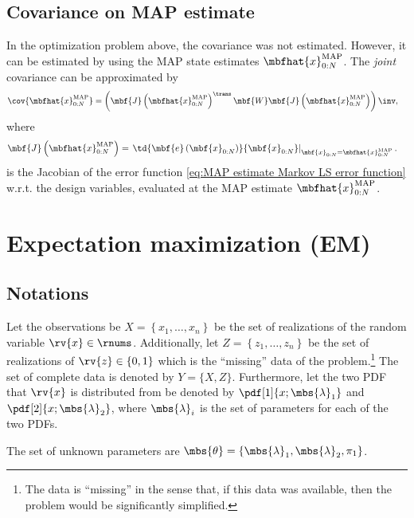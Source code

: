 \subsection{Covariance on MAP estimate}
In the optimization problem above, the covariance was not estimated. However, it can be estimated by using the MAP state estimates $\mbfhat{x}^{\mathrm{MAP}}_{0:N}$. The \emph{joint} covariance can be approximated by
\begin{align}
    \cov{\mbfhat{x}_{0:N}^{\mathrm{MAP}}} &=
    \left( \mbf{J}\left(\mbfhat{x}_{0:N}^{\mathrm{MAP}}\right)^{\trans}\mbf{W}\mbf{J}\left(\mbfhat{x}_{0:N}^{\mathrm{MAP}}\right) \right)\inv,
\end{align}
where 
\begin{align}
    \mbf{J}\left(\mbfhat{x}_{0:N}^{\mathrm{MAP}}\right) &= 
    \left. \td{\mbf{e}\left( \mbf{x}_{0:N} \right)}{\mbf{x}_{0:N}}\right|_{\mbf{x}_{0:N}=\mbfhat{x}_{0:N}^{\mathrm{MAP}}}.
\end{align}
is the Jacobian of the error function \eqref{eq:MAP estimate Markov LS error function} w.r.t. the design variables, evaluated at the MAP estimate $\mbfhat{x}_{0:N}^{\mathrm{MAP}}$.



\section{Expectation maximization (EM)}
\newcommand{\zhat}[2][{}]{\ifthenelse{\equal{#1}{}}{\hat{z}_{#2}}{\hat{z}_{#2}^{(#1)}}}

\subsection{Notations}
Let the observations be $X=\left\{ x_{1}, \ldots, x_{n} \right\}$ be the set of realizations of the random variable $\rv{x}\in\rnums$. Additionally, let $Z = \left\{ z_{1},\ldots, z_{n} \right\}$ be the set of realizations of $\rv{z}\in\left\{ 0,1 \right\}$ which is the ``missing'' data of the problem.\footnote{The data is ``missing'' in the sense that, if this data was available, then the problem would be significantly simplified.} The set of complete data is denoted by $Y = \{X, Z\}$.
Furthermore, let the two PDF that $\rv{x}$ is distributed from be denoted by $\pdf[1]{x; \mbs{\lambda}_{1}}$ and $\pdf[2]{x; \mbs{\lambda}_{2}}$, where $\mbs{\lambda}_{i}$ is the set of parameters for each of the two PDFs.

The set of unknown parameters are $\mbs{\theta} = \left\{ \mbs{\lambda}_{1}, \mbs{\lambda}_{2}, \pi_{1} \right\}$.

